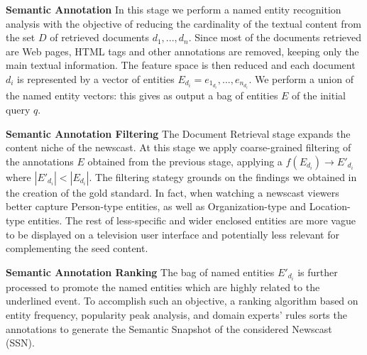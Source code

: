 \documentclass{llncs}
\begin{document}
{\bf Semantic Annotation} In this stage we perform a named entity recognition analysis with the objective of reducing the cardinality of the textual content from the set $D$ of retrieved documents ${d_1, ..., d_n}$. Since most of the documents retrieved are Web pages, HTML tags and other annotations are removed, keeping only the main textual information. The feature space is then reduced and each document $d_i$ is represented by a vector of entities $E_{d_i}={e_{1_{d_i}}, ..., e_{n_{d_i}}}$. We perform a union of the named entity vectors: this gives as output a bag of entities $E$ of the initial query $q$. 

{\bf Semantic Annotation Filtering} The Document Retrieval stage expands the content niche of the newscast. At this stage we apply coarse-grained filtering of the annotations $E$ obtained from the previous stage, applying a $f\left (  E_{d_i}\right )\rightarrow  E'_{d_i}$ where $\left |E'_{d_i}  \right | < \left |E_{d_i}  \right |$. The filtering stategy grounds on the findings we obtained in the creation of the gold standard. In fact, when watching a newscast viewers better capture Person-type entities, as well as Organization-type and Location-type entities. The rest of less-specific and wider enclosed entities are more vague to be displayed on a television user interface and potentially less relevant for complementing the seed content. 

{\bf Semantic Annotation Ranking}
The bag of named entities $E'_{d_i}$ is further processed to promote the named entities which are highly related to the underlined event. To accomplish such an objective, a ranking algorithm based on entity frequency, popularity peak analysis, and domain experts' rules sorts the annotations to generate the Semantic Snapshot of the considered Newscast (SSN).

\end{document}
